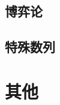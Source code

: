 \documentclass[12pt,a4paper,titlepage]{article}
\begin{document}
	\subsection{博弈论}

    \subsection{特殊数列}

\section{\LARGE 其他}

\end{document}
